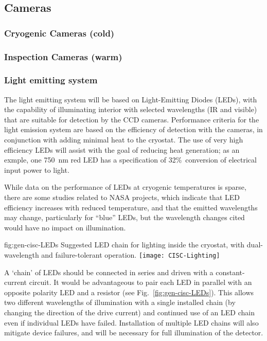 \subsection{Cameras}
\label{sec:fdgen-slow-cryo-cameras}

\subsubsection{Cryogenic Cameras (cold)}

\subsubsection{Inspection Cameras (warm)}

\subsubsection{Light emitting system}
The light emitting system will be based on Light-Emitting Diodes (LEDs),
with the capability of illuminating interior with selected wavelengths
(IR and visible) that are suitable for detection by the CCD cameras.
Performance criteria for the light emission system are based on the
efficiency of detection with the cameras, in conjunction with adding
minimal heat to the cryostat. The use of very high efficiency LEDs will
assist with the goal of reducing heat generation; as an exmple, one
\SI{750}{nm}
red LED has a specification of 32\%\ conversion of
electrical input power to light. 

While data on the performance of LEDs at cryogenic temperatures is sparse,
there are some studies related to NASA projects\cite{Carron:2017zzz}, which
indicate that LED efficiency increases with reduced temperature,
and that the emitted wavelengths may change, particularly for ``blue'' LEDs,
but the wavelength changes cited would have no impact on illumination.

\begin{dunefigure}{fig:gen-cisc-LEDs}
  {Suggested LED chain for lighting inside the cryostat, with
    dual-wavelength and failure-tolerant operation.}
\texttt{[image: CISC-Lighting]}
\end{dunefigure}

A `chain' of LEDs should be connected in series and driven with a
constant-current circuit. It would be advantageous to pair each
LED in parallel with an opposite polarity LED and a resistor
(see Fig.~\ref{fig:gen-cisc-LEDs}).
This allows two different wavelengths of illumination with a single installed
chain (by changing the direction of the drive current) and 
continued use of an LED chain even if individual LEDs have failed.
Installation of multiple LED chains will also mitigate device failures,
and will be necessary for full illumination of the detector.
